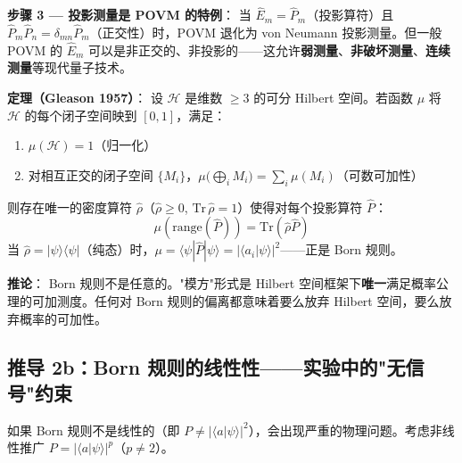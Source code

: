 \textbf{步骤 3 — 投影测量是 POVM 的特例}：\fbox{[S]} 当 $\hat{E}_m = \hat{P}_m$（投影算符）且 $\hat{P}_m\hat{P}_n = \delta_{mn}\hat{P}_m$（正交性）时，POVM 退化为 von Neumann 投影测量。但一般 POVM 的 $\hat{E}_m$ 可以是非正交的、非投影的——这允许\textbf{弱测量}、\textbf{非破坏测量}、\textbf{连续测量}等现代量子技术。


\textbf{定理（Gleason 1957）}：\fbox{[S]} 设 $\mathcal{H}$ 是维数 $\ge 3$ 的可分 Hilbert 空间。若函数 $\mu$ 将 $\mathcal{H}$ 的每个闭子空间映到 $[0,1]$，满足：
\begin{enumerate}
\item $\mu(\mathcal{H}) = 1$（归一化）
\item 对相互正交的闭子空间 $\{M_i\}$，$\mu\big(\bigoplus_i M_i\big) = \sum_i \mu(M_i)$（可数可加性）
\end{enumerate}
则存在唯一的密度算符 $\hat{\rho}$（$\hat{\rho} \ge 0$, $\text{Tr}\,\hat{\rho}=1$）使得对每个投影算符 $\hat{P}$：
\begin{equation}
\mu(\text{range}(\hat{P})) = \text{Tr}(\hat{\rho}\hat{P})
\end{equation}
当 $\hat{\rho} = |\psi\rangle\langle\psi|$（纯态）时，$\mu = \langle\psi|\hat{P}|\psi\rangle = |\langle a_i|\psi\rangle|^2$——正是 Born 规则。

\textbf{推论}：\fbox{[S]} Born 规则不是任意的。"模方"形式是 Hilbert 空间框架下\textbf{唯一}满足概率公理的可加测度。任何对 Born 规则的偏离都意味着要么放弃 Hilbert 空间，要么放弃概率的可加性。


\subsection{推导 2b：Born 规则的线性性——实验中的"无信号"约束}

如果 Born 规则不是线性的（即 $P \ne |\langle a|\psi\rangle|^2$），会出现严重的物理问题。考虑非线性推广 $P = |\langle a|\psi\rangle|^p$（$p \ne 2$）。

